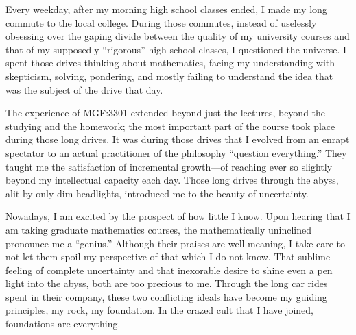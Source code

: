 \documentclass[12pt]{article}
\begin{document}
Every weekday, after my morning high school classes ended, I made my long commute to the local college. During those commutes, instead of uselessly obsessing over the gaping divide between the quality of my university courses and that of my supposedly ``rigorous'' high school classes, I questioned the universe. I spent those drives thinking about mathematics, facing my understanding with skepticism, solving, pondering, and mostly failing to understand the idea that was the subject of the drive that day.

The experience of MGF:3301 extended beyond just the lectures, beyond the studying and the homework; the most important part of the course took place during those long drives. It was during those drives that I evolved from an enrapt spectator to an actual practitioner of the philosophy ``question everything.'' They taught me the satisfaction of incremental growth---of reaching ever so slightly beyond my intellectual capacity each day. Those long drives through the abyss, alit by only dim headlights, introduced me to the beauty of uncertainty.

Nowadays, I am excited by the prospect of how little I know. Upon hearing that I am taking graduate mathematics courses, the mathematically uninclined pronounce me a ``genius.'' Although their praises are well-meaning, I take care to not let them spoil my perspective of that which I do not know. That sublime feeling of complete uncertainty and that inexorable desire to shine even a pen light into the abyss, both are too precious to me. Through the long car rides spent in their company, these two conflicting ideals have become my guiding principles, my rock, my foundation. In the crazed cult that I have joined, foundations are everything.
\end{document}
